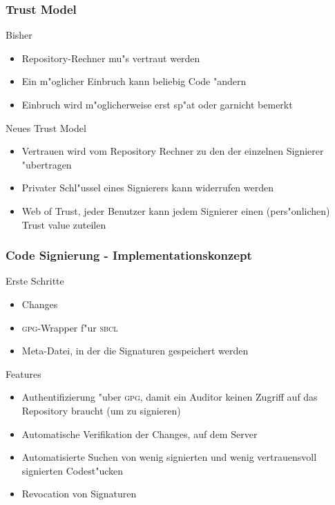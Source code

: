 \documentclass[german]{beamer}
\newcommand{\GPG}{\textsc{gpg}}
\newcommand{\SBCL}{\textsc{sbcl}}
\begin{document}
\begin{frame}
  \frametitle{Trust Model}
  \begin{block}{Bisher}
    \begin{itemize}
      \item Repository-Rechner mu"s vertraut werden
      \item Ein m"oglicher Einbruch kann beliebig Code "andern
      \item Einbruch wird m"oglicherweise erst sp"at oder garnicht bemerkt
    \end{itemize}
  \end{block}
  \begin{block}{Neues Trust Model}
    \begin{itemize}
      \item Vertrauen wird vom Repository Rechner zu den
         der einzelnen Signierer "ubertragen
      \item Privater Schl"ussel eines Signierers kann widerrufen werden
      \item Web of Trust, jeder Benutzer kann jedem Signierer
         einen (pers"onlichen) Trust value zuteilen
    \end{itemize}
  \end{block}
\end{frame}

\begin{frame}
  \frametitle{Code Signierung - Implementationskonzept}
  \begin{block}{Erste Schritte}
    \begin{itemize}
      \item Changes
      \item \GPG{}-Wrapper f"ur \SBCL
      \item Meta-Datei, in der die Signaturen gespeichert werden
    \end{itemize}
  \end{block}
  \begin{block}{Features}
    \begin{itemize}
      \item Authentifizierung "uber \GPG{}, damit ein Auditor keinen Zugriff
        auf das Repository braucht (um zu signieren)
      \item Automatische Verifikation der Changes, auf dem Server
      \item Automatisierte Suchen von wenig signierten und wenig
        vertrauensvoll signierten Codest"ucken
      \item Revocation von Signaturen
    \end{itemize}
  \end{block}
\end{frame}
\end{document}
